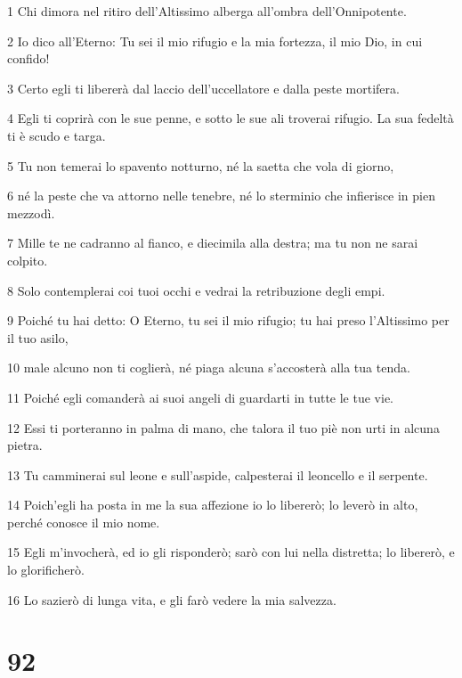 \par 1 Chi dimora nel ritiro dell'Altissimo alberga all'ombra dell'Onnipotente.
\par 2 Io dico all'Eterno: Tu sei il mio rifugio e la mia fortezza, il mio Dio, in cui confido!
\par 3 Certo egli ti libererà dal laccio dell'uccellatore e dalla peste mortifera.
\par 4 Egli ti coprirà con le sue penne, e sotto le sue ali troverai rifugio. La sua fedeltà ti è scudo e targa.
\par 5 Tu non temerai lo spavento notturno, né la saetta che vola di giorno,
\par 6 né la peste che va attorno nelle tenebre, né lo sterminio che infierisce in pien mezzodì.
\par 7 Mille te ne cadranno al fianco, e diecimila alla destra; ma tu non ne sarai colpito.
\par 8 Solo contemplerai coi tuoi occhi e vedrai la retribuzione degli empi.
\par 9 Poiché tu hai detto: O Eterno, tu sei il mio rifugio; tu hai preso l'Altissimo per il tuo asilo,
\par 10 male alcuno non ti coglierà, né piaga alcuna s'accosterà alla tua tenda.
\par 11 Poiché egli comanderà ai suoi angeli di guardarti in tutte le tue vie.
\par 12 Essi ti porteranno in palma di mano, che talora il tuo piè non urti in alcuna pietra.
\par 13 Tu camminerai sul leone e sull'aspide, calpesterai il leoncello e il serpente.
\par 14 Poich'egli ha posta in me la sua affezione io lo libererò; lo leverò in alto, perché conosce il mio nome.
\par 15 Egli m'invocherà, ed io gli risponderò; sarò con lui nella distretta; lo libererò, e lo glorificherò.
\par 16 Lo sazierò di lunga vita, e gli farò vedere la mia salvezza.

\chapter{92}

